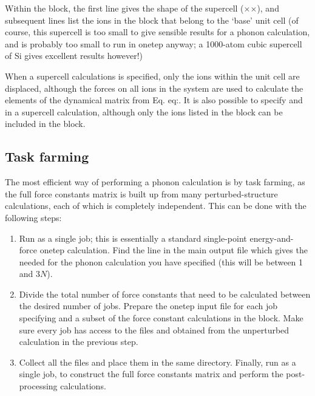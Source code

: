 \documentclass[letterpaper,10pt,english]{sphinxmanual}
\begin{document}
Within the  block, the first line gives the shape of the
supercell (\(\times\)\(\times\)), and
subsequent lines list the ions in the  block that
belong to the ‘base’ unit cell (of course, this supercell is too small
to give sensible results for a phonon calculation, and is probably too
small to run in onetep anyway; a 1000-atom cubic supercell of Si gives
excellent results however!)

When a supercell calculations is specified, only the ions within the
unit cell are displaced, although the forces on all ions in the system
are used to calculate the elements of the dynamical matrix from
Eq. eq:. It is also possible to specify
 and  in a supercell
calculation, although only the ions listed in the  block
can be included in the  block.


\subsection{Task farming}
\label{\detokenize{phonons:task-farming}}
The most efficient way of performing a phonon calculation is by task
farming, as the full force constants matrix is built up from many
perturbed-structure calculations, each of which is completely
independent. This can be done with the following steps:
\begin{enumerate}
\item {} 
Run  as a single job; this is essentially a
standard single-point energy-and-force onetep calculation. Find the
line in the main output file which gives the
 needed for the phonon calculation you
have specified (this will be between 1 and \(3N\)).

\item {} 
Divide the total number of force constants that need to be calculated
between the desired number of jobs. Prepare the onetep input file for
each job specifying  and a subset of the
force constant calculations in the  block. Make
sure every job has access to the files  and
 obtained from the unperturbed
calculation in the previous step.

\item {} 
Collect all the  files and place them
in the same directory. Finally, run  as a
single job, to construct the full force constants matrix and perform
the post-processing calculations.

\end{enumerate}
\end{document}
